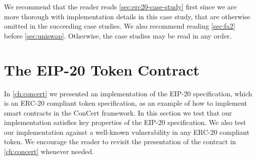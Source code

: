 \documentclass[twoside,11pt,openright]{report}
\begin{document}
We recommend that the reader reads \autoref{sec:erc20-case-study} first since we are more thorough with implementation details in this case study, that are otherwise omitted in the succeeding case studies. We also recommend reading \autoref{sec:fa2} before \autoref{sec:uniswap}. Otherwise, the case studies may be read in any order.

\section{The EIP-20 Token Contract}
\label{sec:erc20-case-study}
In \autoref{ch:concert} we presented an implementation of the EIP-20 specification\cite{eip20}, which is an ERC-20 compliant token specification, as an example of how to implement smart contracts in the ConCert framework. In this section we test that our implementation satisfies key properties of the EIP-20 specification. We also test our implementation against a well-known vulnerability in any ERC-20 compliant token. We encourage the reader to revisit the presentation of the contract in \autoref{ch:concert} whenever needed.
\end{document}
